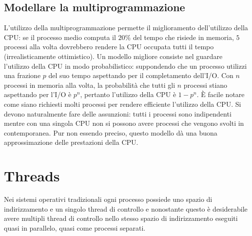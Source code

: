\subsection{Modellare la multiprogrammazione}
L'utilizzo della multiprogrammazione permette il miglioramento dell'utilizzo della CPU: se il processo medio computa il $20\%$ del tempo che risiede in memoria, $5$ processi alla volta
dovrebbero rendere la CPU occupata tutti il tempo (irrealisticamente ottimistico). Un modello migliore consiste nel guardare l'utilizzo della CPU in modo probabilistico: suppondendo che
un processo utilizzi una frazione $p$ del suo tempo aspettando per il completamento dell'I/O. Con $n$ processi in memoria alla volta, la probabilit\`a che tutti gli $n$ processi stiano
aspettando per l'I/O \`e $p^n$, pertanto l'utilizzo della CPU \`e $1-p^n$. \`E facile notare come siano richiesti molti processi per rendere efficiente l'utilizzo della CPU. Si devono
naturalmente fare delle assunzioni: tutti i processi sono indipendenti mentre con una singola CPU non si possono avere processi che vengono svolti in contemporanea. Pur non essendo
preciso, questo modello d\`a una buona approssimazione delle prestazioni della CPU.
\section{Threads}
Nei sistemi operativi tradizionali ogni processo possiede uno spazio di indirizzamento e un singolo thread di controllo e nonostante questo \`e desiderabile avere multipli thread di
controllo nello stesso spazio di indirizzamento eseguiti quasi in parallelo, quasi come processi separati.
